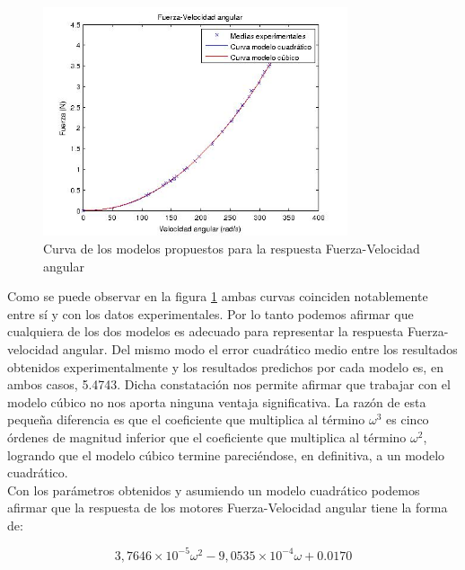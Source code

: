 \documentclass[spanish,12pt,a4paper,titlepage]{report}
\begin{document}
\begin{figure}
  \vspace{-20pt}
  \begin{center}
    \includegraphics[width=0.8\textwidth]{./Pics/modsfvel.jpg}
  \end{center}
  \vspace{-20pt}
  \caption{Curva de los modelos propuestos para la respuesta Fuerza-Velocidad angular}
  \label{fig:grafica2}
  \vspace{-10pt}
\end{figure}

Como se puede observar en la figura \ref{fig:grafica2} ambas curvas coinciden notablemente entre sí y con los datos experimentales. Por lo tanto podemos afirmar que cualquiera de los dos modelos es adecuado para representar la respuesta Fuerza-velocidad angular. Del mismo modo el error cuadrático medio entre los resultados obtenidos experimentalmente y los resultados predichos por cada modelo es, en ambos casos, 5.4743. Dicha constatación nos permite afirmar que trabajar con el modelo cúbico no nos aporta ninguna ventaja significativa. La razón de esta pequeña diferencia es que el coeficiente que multiplica al término $\omega^3$ es cinco órdenes de magnitud inferior que el coeficiente que multiplica al término $\omega^2$, logrando que el modelo cúbico termine pareciéndose, en definitiva, a un modelo cuadrático.\\

Con los parámetros obtenidos y asumiendo un modelo cuadrático podemos afirmar que la respuesta de los motores Fuerza-Velocidad angular tiene la forma de:

\begin{equation}
3,7646 \times 10^{-5}\omega ^2 - 9,0535 \times 10^{-4}\omega +0.0170
\end{equation}
\end{document}
